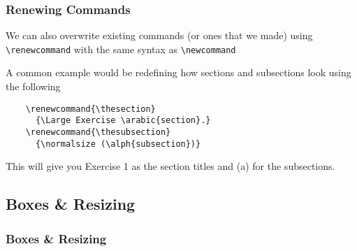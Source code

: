 \documentclass{beamer}
\begin{document}
\begin{frame}[fragile]
  \frametitle{Renewing Commands}
  We can also overwrite existing commands (or ones that we made) using \verb.\renewcommand. with the same syntax as \verb.\newcommand.

  A common example would be redefining how sections and subsections look using the following
  \begin{verbatim}
    \renewcommand{\thesection}
      {\Large Exercise \arabic{section}.}
    \renewcommand{\thesubsection}
      {\normalsize (\alph{subsection})}
  \end{verbatim}
  This will give you {\Large Exercise 1} as the section titles and {\normalsize (a)} for the subsections.
\end{frame}

\subsection{Boxes \& Resizing}
\begin{frame}
	\frametitle{Boxes \& Resizing}
\end{frame}
\end{document}

